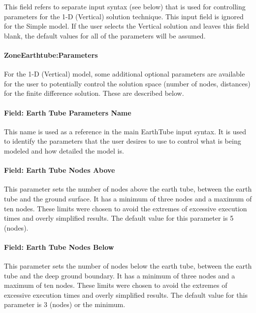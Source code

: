 This field refers to separate input syntax (see below) that is used for controlling parameters for the 1-D (Vertical) solution technique.  This input field is ignored for the Simple model.  If the user selects the Vertical solution and leaves this field blank, the default values for all of the parameters will be assumed.

\paragraph{ZoneEarthtube:Parameters}\label{field-earth-tube-parameters}
For the 1-D (Vertical) model, some additional optional parameters are available for the user to potentially control the solution space (number of nodes, distances) for the finite difference solution.  These are described below.

\paragraph{Field: Earth Tube Parameters Name}\label{field-earth-tube-parameters-name}
This name is used as a reference in the main EarthTube input syntax.  It is used to identify the parameters that the user desires to use to control what is being modeled and how detailed the model is.

\paragraph{Field: Earth Tube Nodes Above}\label{field-earth-tube-nodes-above}
This parameter sets the number of nodes above the earth tube, between the earth tube and the ground surface.  It has a minimum of three nodes and a maximum of ten nodes.  These limits were chosen to avoid the extremes of excessive execution times and overly simplified results.  The default value for this parameter is 5 (nodes).

\paragraph{Field: Earth Tube Nodes Below}\label{field-earth-tube-nodes-below}
This parameter sets the number of nodes below the earth tube, between the earth tube and the deep ground boundary.  It has a minimum of three nodes and a maximum of ten nodes.  These limits were chosen to avoid the extremes of excessive execution times and overly simplified results.  The default value for this parameter is 3 (nodes) or the minimum.

